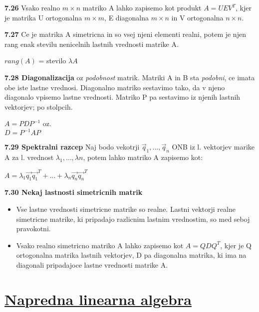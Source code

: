 \documentclass{article}
\begin{document}
\begin{multicols}{2}
\textbf{7.26} Vsako realno $m \times n$ matriko A lahko zapisemo kot produkt
$A = UEV^{T}$, kjer je matrika U ortogonalna $m \times m$, E diagonalna $m \times n$ in
V ortogonalna $n \times n$.

\textbf{7.27} Ce je  matrika A simetricna in so vsej njeni elementi realni, potem je njen rang enak stevilu nenicelnih lastnih
vrednosti matrike A.
\begin{center}
    $rang(A)$ = stevilo $\lambda A$
\end{center}

\textbf{7.28 Diagonalizacija} oz \textit{podobnost} matrik. Matriki A in B sta \textit{podobni}, ce imata
obe iste lastne vrednosi. Diagonalno matriko sestavimo tako, da v njeno diagonalo vpisemo lastne vrednosti. Matriko 
P pa sestavimo iz njenih lastnih vektorjev; po stolpcih.
\begin{center}
    \begin{math}
        A = PDP^{-1}
    \end{math} oz.\\
    \begin{math}
        D = P^{-1}AP
    \end{math}
\end{center}

\textbf{7.29 Spektralni razcep}
Naj bodo vekotrji $\vec{q}_{1}, \dots, \vec{q}_{n}$ ONB iz l. vektorjev marike A za l. vrednost $\lambda_{1}, \dots, \lambda{n}$,
potem lahko matriko A zapisemo kot:
\begin{center}
    \begin{math}
        A = \lambda_{1} \vec{q_{1}} \vec{q_{1}}^{T} + \dots + \lambda_{n} \vec{q_{n}} \vec{q_{n}}^{T}
    \end{math}
\end{center}

\textbf{7.30 Nekaj lastnosti simetricnih matrik}
\begin{itemize}
    \item Vse lastne vrednosti simetricne matrike so realne. Lastni vektorji realne simetricne matrike, ki 
    pripadajo razlicnim lastnim vrednostim, so med seboj pravokotni.
    \item Vsako realno simetricno matriko A lahko zapisemo kot $A = QDQ^{T}$, kjer je Q ortogonalna matrika lastnih vektorjev, D pa diagonalna matrika,
    ki ima na diagonali pripadajoce lastne vrednosti matrike A.
\end{itemize}

\section{\underline{Napredna linearna algebra}}


\end{multicols}
\end{document}
